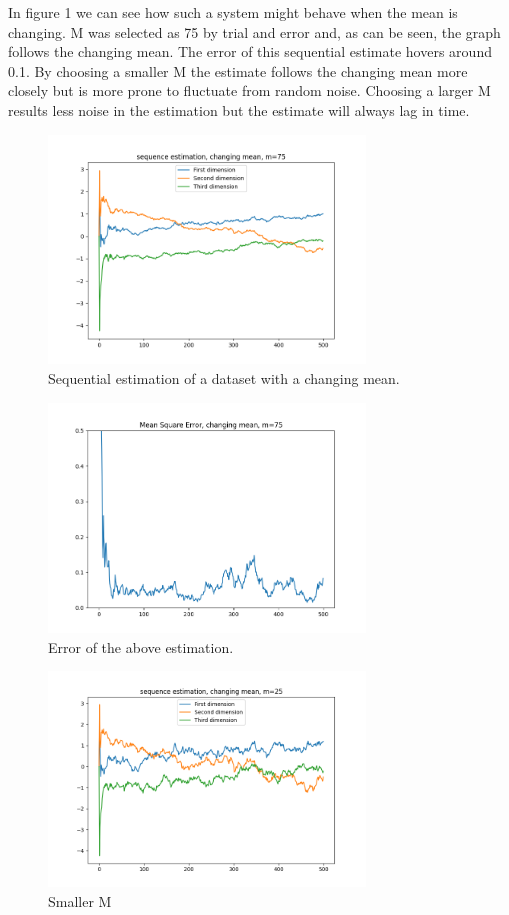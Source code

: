 \documentclass{article}
\begin{document}
In figure 1 we can see how such a system might behave when the mean is changing. M was selected as 75 by trial and error and, as can be seen, the graph follows the changing mean. The error of this sequential estimate hovers around 0.1. By choosing a smaller M the estimate follows the changing mean more closely but is more prone to fluctuate from random noise. Choosing a larger M results less noise in the estimation but the estimate will always lag in time.

\begin{figure}[h]
    \centering
    \includegraphics[width=0.75\textwidth]{03_sequential_estimation/indep_1_m75.png}
    \caption{Sequential estimation of a dataset with a changing mean.}
\end{figure}
\begin{figure}[h]
    \centering
    \includegraphics[width=0.75\textwidth]{03_sequential_estimation/indep_2_m75.png}
    \caption{Error of the above estimation.}
\end{figure}
\begin{figure}[h]
    \centering
    \includegraphics[width=0.75\textwidth]{03_sequential_estimation/indep_1_m25.png}
    \caption{Smaller M}
\end{figure}
\end{document}
